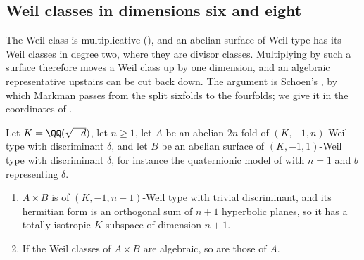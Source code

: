 \subsection{Weil classes in dimensions six and eight}\label{ssec:weilsix}

The Weil class is multiplicative (), and an abelian
surface of Weil type has its Weil classes in degree two, where they are
divisor classes. Multiplying by such a surface therefore moves a Weil class
up by one dimension, and an algebraic representative upstairs can be cut
back down. The argument is Schoen's \cite[Proposition~10]{Sch98}, by which
Markman passes from the split sixfolds to the fourfolds; we give it in the
coordinates of .

\begin{proposition}\label{prop:stabilise}
Let $K=\QQ(\sqrt{-d})$, let $n\ge1$, let $A$ be an abelian $2n$-fold of
$(K,-1,n)$-Weil type with discriminant $\delta$, and let $B$ be an abelian
surface of $(K,-1,1)$-Weil type with discriminant $\delta$, for instance the
quaternionic model of  with $n=1$ and $b$ representing
$\delta$.
\begin{enumerate}[label=\textup{(\roman*)},leftmargin=2.6em,itemsep=2pt]
\item $A\times B$ is of $(K,-1,n+1)$-Weil type with trivial discriminant,
  and its hermitian form is an orthogonal sum of $n+1$ hyperbolic planes, so
  it has a totally isotropic $K$-subspace of dimension $n+1$.
\item If the Weil classes of $A\times B$ are algebraic, so are those of $A$.
\end{enumerate}
\end{proposition}

